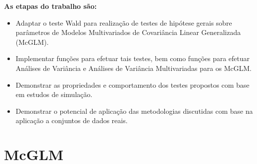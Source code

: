 \documentclass[10pt,
  aspectratio=169,
  serif,
  mathserif,
  professionalfont,
  compress,
  handout,
  ]{beamer}\usepackage[]{graphicx}\usepackage[]{color}
\begin{document}

\begin{frame}[c, allowframebreaks]
  
  \textbf{As etapas do trabalho são:}
  
  \begin{itemize}
    \item Adaptar o teste Wald para realização de testes de hipótese gerais sobre parâmetros de Modelos Multivariados de Covariância Linear Generalizada (McGLM).
    
    \item Implementar funções para efetuar tais testes, bem como funções para efetuar Análises de Variância e Análises de Variância Multivariadas para os McGLM.
    
    \item Demonstrar as propriedades e comportamento dos testes propostos com base em estudos de simulação.
    
    \item Demonstrar o potencial de aplicação das metodologias discutidas com base na aplicação a conjuntos de dados reais.
    
  \end{itemize}

\end{frame}


\section{McGLM}
\end{document}
